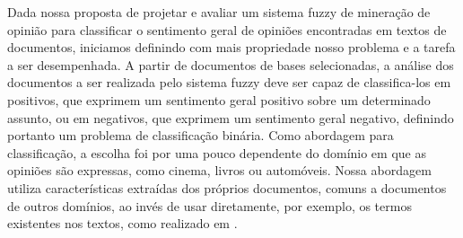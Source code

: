 

%
%

Dada nossa proposta de projetar e avaliar um sistema fuzzy de mineração de opinião para classificar o sentimento geral de opiniões encontradas em textos de documentos, iniciamos definindo com mais propriedade nosso problema e a tarefa a ser desempenhada. A partir de documentos de bases selecionadas, a análise dos documentos a ser realizada pelo sistema fuzzy deve ser capaz de classifica-los em positivos, que exprimem um sentimento geral positivo sobre um determinado assunto, ou em negativos, que exprimem um sentimento geral negativo, definindo portanto um problema de classificação binária. Como abordagem para classificação, a escolha foi por uma pouco dependente do domínio em que as opiniões são expressas, como cinema, livros ou automóveis. Nossa abordagem utiliza características extraídas dos próprios documentos, comuns a documentos de outros domínios, ao invés de usar diretamente, por exemplo, os termos existentes nos textos, como realizado em .

